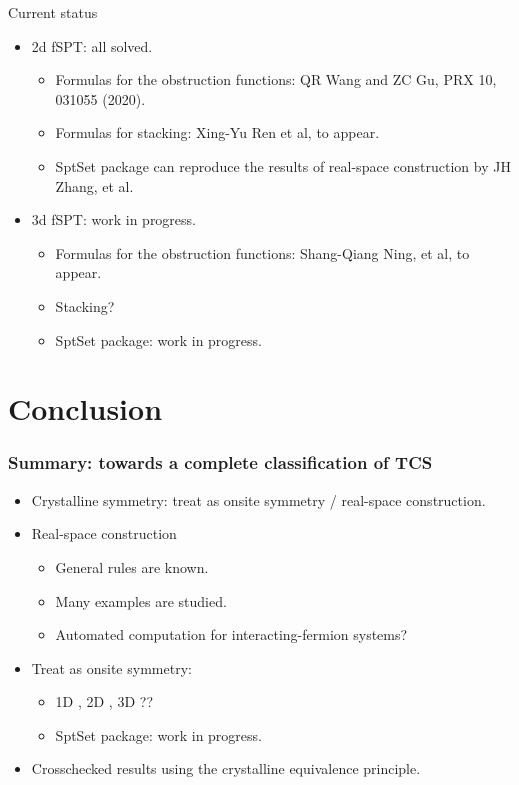 \documentclass[xcolor=table, 11pt, aspectratio=169]{beamer}
\begin{document}
\begin{frame}{Current status}
  \begin{itemize}
    \item 2d fSPT: all solved.
    \begin{itemize}
      \item Formulas for the obstruction functions: QR Wang and ZC Gu, PRX 10, 031055 (2020).
      \item Formulas for stacking: Xing-Yu Ren et al, to appear.
      \item SptSet package can reproduce the results of real-space construction by JH Zhang, et al.
    \end{itemize}
    \item 3d fSPT: work in progress.
    \begin{itemize}
      \item Formulas for the obstruction functions: Shang-Qiang Ning, et al, to appear.
      \item Stacking?
      \item SptSet package: work in progress.
    \end{itemize}
  \end{itemize}
\end{frame}

\section{Conclusion}

\begin{frame}
\frametitle{Summary: towards a complete classification of TCS}
\begin{itemize}
\item Crystalline symmetry: treat as onsite symmetry / real-space construction.
\item Real-space construction
  \begin{itemize}
  \item General rules are known.
  \item Many examples are studied.
  \item Automated computation for interacting-fermion systems?
  \end{itemize}
\item Treat as onsite symmetry:
  \begin{itemize}
  \item 1D , 2D , 3D ??
  \item SptSet package: work in progress.
  \end{itemize}
\item Crosschecked results using the crystalline equivalence principle.
\end{itemize}
\end{frame}
\end{document}

